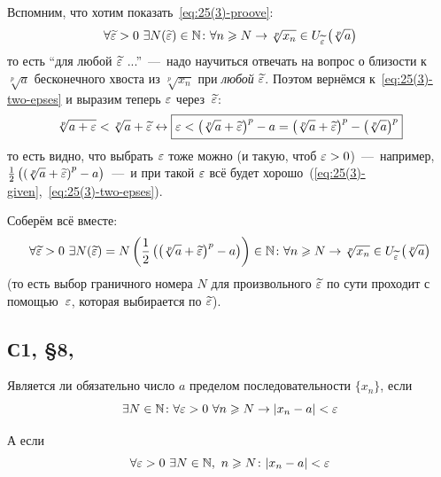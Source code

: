 \documentclass[a4paper,12pt]{article}
\begin{document}
\begin{solution}
    Вспомним, что хотим показать~\eqref{eq:25(3)-proove}:
    \[
      \forall \widetilde {\varepsilon} > 0\ \exists N(\widetilde {\varepsilon}) \in \mathbb N\colon \forall n \geqslant N \to \sqrt[p]{x_n} \in U_{\widetilde {\varepsilon}}\left(\sqrt[p]{a}\right)
    \]
    то есть ``для любой $\widetilde {\varepsilon}$ ...''~---~надо научиться отвечать на вопрос о близости к $\sqrt[p]{a}$ бесконечного хвоста из $\sqrt[p]{x_n}$ при \emph{любой} $\widetilde {\varepsilon}$.
    Поэтом вернёмся к~\eqref{eq:25(3)-two-epses} и выразим теперь $\varepsilon$ через~$\widetilde {\varepsilon}$:
    \[
      \sqrt[p]{a + \varepsilon} < \sqrt[p]{a} + \widetilde {\varepsilon} \leftrightarrow \boxed{\varepsilon < \left(\sqrt[p]{a} + \widetilde {\varepsilon}\right)^p - a =\left(\sqrt[p]{a} + \widetilde {\varepsilon}\right)^p - \left(\sqrt[p]{a}\right)^p}
    \]
    то есть видно, что выбрать $\varepsilon$ тоже можно (и такую, чтоб $\eps \hm> 0$)~---~например, $\frac{1}{2}\left(\left(\sqrt[p]{a} \hm+ \widetilde \eps\right)^p \hm- a\right)$~---~и при такой $\varepsilon$ всё будет хорошо~(\ref{eq:25(3)-given},~\ref{eq:25(3)-two-epses}).
    
    Соберём всё вместе:
    \[
      \forall \widetilde {\varepsilon} > 0\ \exists N(\widetilde {\varepsilon}) = N\left(\frac{1}{2}\left(\left(\sqrt[p]{a} + \widetilde {\varepsilon}\right)^p - a\right)\right) \in \mathbb N\colon \forall n \geqslant N \to \sqrt[p]{x_n} \in U_{\widetilde {\varepsilon}}\left(\sqrt[p]{a}\right)
    \]
    (то есть выбор граничного номера $N$ для произвольного $\widetilde {\varepsilon}$ по сути проходит с помощью~$\varepsilon$, которая выбирается по $\widetilde {\varepsilon}$).
  \end{solution}
  
  
  \subsection{С1, \S 8, }
  
  Является ли обязательно число $a$ пределом последовательности $\{x_n\}$, если
  \begin{equation}\label{eq:28-point-1}
    \exists N \in \mathbb N\colon \forall \varepsilon > 0\ \forall n \geqslant N \to |x_n - a| < \varepsilon
  \end{equation}
  
  А если
  \begin{equation}\label{eq:28-point-2}
    \forall \varepsilon > 0\ \exists N \in \mathbb N,\ n \geqslant N\colon |x_n - a| < \varepsilon
  \end{equation}
  
\end{document}

